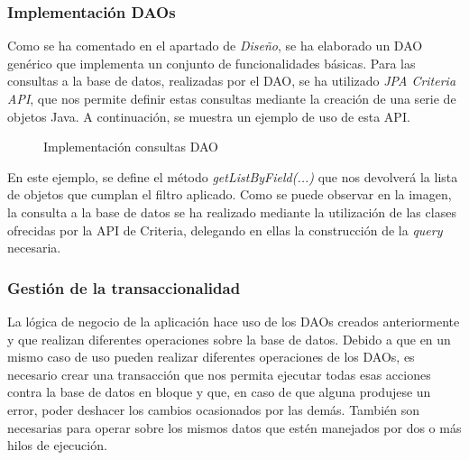 \subsubsection*{Implementación DAOs}
Como se ha comentado en el apartado de \textit{Diseño}, se ha elaborado un DAO genérico que implementa un conjunto de funcionalidades básicas. Para las consultas a la base de datos, realizadas por el DAO, se ha utilizado \textit{JPA Criteria API}, que nos permite definir estas consultas mediante la creación de una serie de objetos Java. A continuación, se muestra un ejemplo de uso de esta API.

\begin{figure}[H]
\centering
{}
\caption{Implementación consultas DAO}
\end{figure}

En este ejemplo, se define el método \textit{getListByField(...)} que nos devolverá la lista de objetos que cumplan el filtro aplicado. Como se puede observar en la imagen, la consulta a la base de datos se ha realizado mediante la utilización de las clases ofrecidas por la API de Criteria, delegando en ellas la construcción de la \textit{query} necesaria.


\subsubsection*{Gestión de la transaccionalidad}
La lógica de negocio de la aplicación hace uso de los DAOs creados anteriormente y que realizan diferentes operaciones sobre la base de datos. Debido a que en un mismo caso de uso pueden realizar diferentes operaciones de los DAOs, es necesario crear una transacción que nos permita ejecutar todas esas acciones contra la base de datos en bloque y que, en caso de que alguna produjese un error, poder deshacer los cambios ocasionados por las demás. También son necesarias para operar sobre los mismos datos que estén manejados por dos o más hilos de ejecución.

